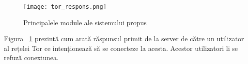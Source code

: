 \begin{figure}[h]
	\centering
	\texttt{[image: tor\_respons.png]}
	\caption{Principalele module ale sistemului propus}
	\label{fig:tor_respons}
\end{figure}
Figura ~\ref{fig:tor_respons}  prezintă cum arată răspunsul primit de la server de către un utilizator al rețelei Tor ce intenționează să se conecteze la acesta. Acestor utilizatori li se refuză conexiunea.  \\


%
%
%
%
%
%  
%    
%    
